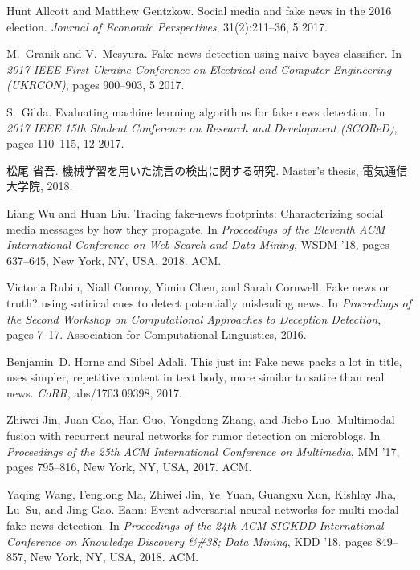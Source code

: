 \begin{thebibliography}{10}

Hunt Allcott and Matthew Gentzkow.
 Social media and fake news in the 2016 election.
 {\em Journal of Economic Perspectives}, 31(2):211--36, 5 2017.

M.~Granik and V.~Mesyura.
 Fake news detection using naive bayes classifier.
 In {\em 2017 IEEE First Ukraine Conference on Electrical and Computer
  Engineering (UKRCON)}, pages 900--903, 5 2017.

S.~Gilda.
 Evaluating machine learning algorithms for fake news detection.
 In {\em 2017 IEEE 15th Student Conference on Research and Development
  (SCOReD)}, pages 110--115, 12 2017.

松尾 省吾.
 機械学習を用いた流言の検出に関する研究.
 Master's thesis, 電気通信大学院, 2018.

Liang Wu and Huan Liu.
 Tracing fake-news footprints: Characterizing social media messages by
  how they propagate.
 In {\em Proceedings of the Eleventh ACM International Conference on
  Web Search and Data Mining}, WSDM '18, pages 637--645, New York, NY, USA,
  2018. ACM.

Victoria Rubin, Niall Conroy, Yimin Chen, and Sarah Cornwell.
 Fake news or truth? using satirical cues to detect potentially
  misleading news.
 In {\em Proceedings of the Second Workshop on Computational
  Approaches to Deception Detection}, pages 7--17. Association for
  Computational Linguistics, 2016.

Benjamin~D. Horne and Sibel Adali.
 This just in: Fake news packs a lot in title, uses simpler,
  repetitive content in text body, more similar to satire than real news.
 {\em CoRR}, abs/1703.09398, 2017.

Zhiwei Jin, Juan Cao, Han Guo, Yongdong Zhang, and Jiebo Luo.
 Multimodal fusion with recurrent neural networks for rumor detection
  on microblogs.
 In {\em Proceedings of the 25th ACM International Conference on
  Multimedia}, MM '17, pages 795--816, New York, NY, USA, 2017. ACM.

Yaqing Wang, Fenglong Ma, Zhiwei Jin, Ye~Yuan, Guangxu Xun, Kishlay Jha, Lu~Su,
  and Jing Gao.
 Eann: Event adversarial neural networks for multi-modal fake news
  detection.
 In {\em Proceedings of the 24th ACM SIGKDD International Conference
  on Knowledge Discovery \&\#38; Data Mining}, KDD '18, pages 849--857, New
  York, NY, USA, 2018. ACM.


\end{thebibliography}
